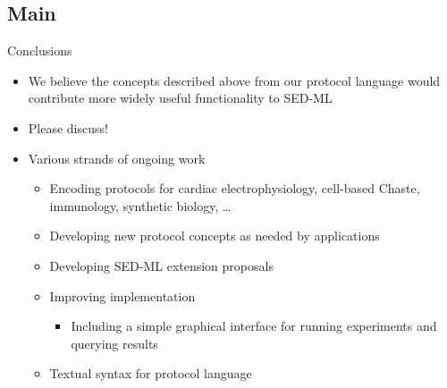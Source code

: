\documentclass[t,xcolor={usenames,dvipsnames}]{beamer}
\newcommand{\subitem}[1]{\begin{itemize}[<.->]\item #1 \end{itemize}}
\begin{document}
\subsection*{Main}

\begin{frame}{Conclusions}
\begin{itemize}
\item We believe the concepts described above from our protocol
  language would contribute more widely useful functionality to SED-ML
\item Please discuss!
\item Various strands of ongoing work
  \begin{itemize}
  \item Encoding protocols for cardiac electrophysiology, cell-based Chaste, immunology, synthetic biology, \ldots
  \item Developing new protocol concepts as needed by applications
  \item Developing SED-ML extension proposals
  \item Improving implementation
    \subitem{Including a simple graphical interface for running experiments and querying results}
  \item Textual syntax for protocol language
  \end{itemize}
\end{itemize}
\end{frame}
\end{document}
